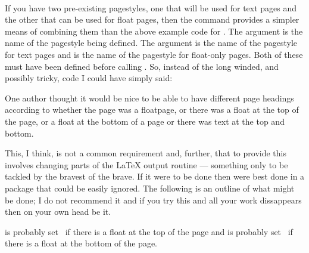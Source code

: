 \begin{syntax}
\cmd{\mergepagefloatstyle} \\
\end{syntax}
    If you have two pre-existing pagestyles, one that will be used for
text pages and the other that can be used for float pages, then the
\cmd{\mergepagefloatstyle} command provides a simpler means of 
combining
them than the above example code for . The argument
 is the name of the pagestyle being defined. The
argument 
is the name of the pagestyle for text pages and  is the
name of the pagestyle for float-only pages. Both of these must have been 
defined before calling \cmd{\mergepagefloatstyle}. So, instead of the long
winded, and possibly tricky, code I could have simply said:
\begin{lcode}
\end{lcode}


    One author thought it would be nice to be able to have different 
page headings according
to whether the page was a floatpage, or there was a float at the top of 
the page, or a float at the bottom of a page or there was text at the 
top and bottom.

    This, I think, is not a common requirement and, further, that to provide 
this involves changing parts of the LaTeX output routine --- something only
to be tackled by the bravest of the brave. If it were to be done then were
best done in a package that could be easily ignored. The following is an
outline of what might be done; I do not recommend it and if you try this 
and all your work dissappears then on your own head be it.

\begin{lcode}
\newif\iffloatattop
  \floatattopfalse
\newif\iffloatatbot
  \floatatbotfalse

\renewcommand*{\@addtotoporbot}{%
  \@getfpsbit \tw@
  \ifodd \@tempcnta
    \@flsetnum \@topnum
    \ifnum \@topnum>\z@
      \@tempswafalse
      \@flcheckspace \@toproom \@toplist
      \if@tempswa
        \@bitor\@currtype{\@midlist\@botlist}%
        \if@test
        \else
          \@flupdates \@topnum \@toproom \@toplist
          \@inserttrue
  \global\floatattoptrue
        \fi
      \fi
    \fi
  \fi
  \if@insert
  \else
    \@addtobot
  \fi}

\renewcommand*{\@addtobot}{%
  \@getfpsbit 4\relax
  \ifodd \@tempcnta
    \@flsetnum \@botnum
    \ifnum \@botnum>\z@
      \@tempswafalse
      \@flcheckspace \@botroom \@botlist
      \if@tempswa
        \global \maxdepth \z@
        \@flupdates \@botnum \@botroom \@botlist
        \@inserttrue
  \global\floatatbottrue
      \fi
    \fi
  \fi}

\let\p@wold@output\@outputpage
\renewcommand*{\@outputpage}{%
  \p@wold@output
  \global\floatattopfalse
  \global\floatatbotfalse}

\endinput
\end{lcode}
 is probably set \ptrue\ if there is a float at the 
top of the page and
 is probably set \ptrue\ if there is a float at the bottom
of the page.


